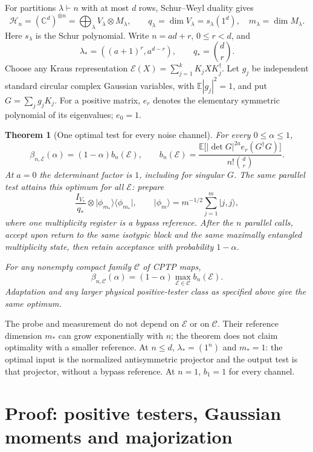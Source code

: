\documentclass[11pt,a4paper]{article}
\newtheorem{theorem}{Theorem}[section]
\theoremstyle{remark}\newtheorem{remark}[theorem]{Remark}
\newcommand{\E}{\mathcal E}
\newcommand{\C}{\mathcal C}
\newcommand{\HH}{\mathcal H}
\newcommand{\EE}{\mathbb E}
\newcommand{\CC}{\mathbb C}
\newcommand{\ket}[1]{\lvert #1\rangle}
\newcommand{\bra}[1]{\langle #1\rvert}
\newcommand{\bal}{\lambda_*}
\begin{document}
For partitions $\lambda\vdash n$ with at most $d$ rows, Schur--Weyl duality gives
\[
\HH_n=(\CC^d)^{\otimes n}
=\bigoplus_\lambda V_\lambda\otimes M_\lambda,
\qquad q_\lambda=\dim V_\lambda=s_\lambda(1^d),\quad
m_\lambda=\dim M_\lambda.
\]
Here $s_\lambda$ is the Schur polynomial. Write $n=ad+r$, $0\le r<d$, and
\[
\bal=((a+1)^r,a^{d-r}),\qquad q_*=\binom dr.
\]
Choose any Kraus representation $\E(X)=\sum_{j=1}^kK_jXK_j^\dagger$. Let $g_j$ be independent standard circular complex Gaussian variables, with $\EE|g_j|^2=1$, and put $G=\sum_jg_jK_j$. For a positive matrix, $e_r$ denotes the elementary symmetric polynomial of its eigenvalues; $e_0=1$.

\begin{theorem}[One optimal test for every noise channel]\label{thm:universal}
For every $0\le\alpha\le1$,
\begin{equation}\boxed{\displaystyle
\beta_{n,\E}(\alpha)=(1-\alpha)b_n(\E),\qquad
b_n(\E)=\frac{\EE\bigl[|\det G|^{2a}e_r(G^\dagger G)\bigr]}
{n!\binom dr}.}\label{eq:main}
\end{equation}
At $a=0$ the determinant factor is $1$, including for singular $G$. The same parallel test attains this optimum for all $\E$: prepare
\[
\frac{I_{V_*}}{q_*}\otimes\ket{\phi_{m_*}}\bra{\phi_{m_*}},
\qquad \ket{\phi_m}=m^{-1/2}\sum_{j=1}^m\ket{j,j},
\]
where one multiplicity register is a bypass reference. After the $n$ parallel calls, accept upon return to the same isotypic block and the same maximally entangled multiplicity state, then retain acceptance with probability $1-\alpha$.

For any nonempty compact family $\C$ of CPTP maps,
\begin{equation}
\beta_{n,\C}(\alpha)=(1-\alpha)\max_{\E\in\C}b_n(\E).
\label{eq:robust}
\end{equation}
Adaptation and any larger physical positive-tester class as specified above give the same optimum.
\end{theorem}

The probe and measurement do not depend on $\E$ or on $\C$. Their reference dimension $m_*$ can grow exponentially with $n$; the theorem does not claim optimality with a smaller reference. At $n\le d$, $\bal=(1^n)$ and $m_*=1$: the optimal input is the normalized antisymmetric projector and the output test is that projector, without a bypass reference. At $n=1$, $b_1=1$ for every channel.

\section{Proof: positive testers, Gaussian moments and majorization}
\end{document}
